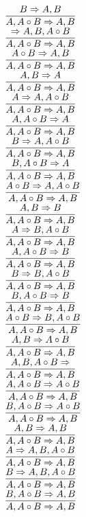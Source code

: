 \documentclass[11pt]{article}
\begin{document}
\begin{center}
\bigskip
\\$\infer{A, A\circ B\Rightarrow A, B}{B\Rightarrow A, B}$
\bigskip
\\$\infer{A, A\circ B\Rightarrow A, B}{\Rightarrow A, B, A\circ B}$
\bigskip
\\$\infer{A, A\circ B\Rightarrow A, B}{A\circ B\Rightarrow A, B}$
\bigskip
\\$\infer{A, A\circ B\Rightarrow A, B}{A, B\Rightarrow A}$
\bigskip
\\$\infer{A, A\circ B\Rightarrow A, B}{A\Rightarrow A, A\circ B}$
\bigskip
\\$\infer{A, A\circ B\Rightarrow A, B}{A, A\circ B\Rightarrow A}$
\bigskip
\\$\infer{A, A\circ B\Rightarrow A, B}{B\Rightarrow A, A\circ B}$
\bigskip
\\$\infer{A, A\circ B\Rightarrow A, B}{B, A\circ B\Rightarrow A}$
\bigskip
\\$\infer{A, A\circ B\Rightarrow A, B}{A\circ B\Rightarrow A, A\circ B}$
\bigskip
\\$\infer{A, A\circ B\Rightarrow A, B}{A, B\Rightarrow B}$
\bigskip
\\$\infer{A, A\circ B\Rightarrow A, B}{A\Rightarrow B, A\circ B}$
\bigskip
\\$\infer{A, A\circ B\Rightarrow A, B}{A, A\circ B\Rightarrow B}$
\bigskip
\\$\infer{A, A\circ B\Rightarrow A, B}{B\Rightarrow B, A\circ B}$
\bigskip
\\$\infer{A, A\circ B\Rightarrow A, B}{B, A\circ B\Rightarrow B}$
\bigskip
\\$\infer{A, A\circ B\Rightarrow A, B}{A\circ B\Rightarrow B, A\circ B}$
\bigskip
\\$\infer{A, A\circ B\Rightarrow A, B}{A, B\Rightarrow A\circ B}$
\bigskip
\\$\infer{A, A\circ B\Rightarrow A, B}{A, B, A\circ B\Rightarrow }$
\bigskip
\\$\infer{A, A\circ B\Rightarrow A, B}{A, A\circ B\Rightarrow A\circ B}$
\bigskip
\\$\infer{A, A\circ B\Rightarrow A, B}{B, A\circ B\Rightarrow A\circ B}$
\bigskip
\\$\infer{A, A\circ B\Rightarrow A, B}{A, B\Rightarrow A, B}$
\bigskip
\\$\infer{A, A\circ B\Rightarrow A, B}{A\Rightarrow A, B, A\circ B}$
\bigskip
\\$\infer{A, A\circ B\Rightarrow A, B}{B\Rightarrow A, B, A\circ B}$
\bigskip
\\$\infer{A, A\circ B\Rightarrow A, B}{B, A\circ B\Rightarrow A, B}$

\end{center}
\end{document}
